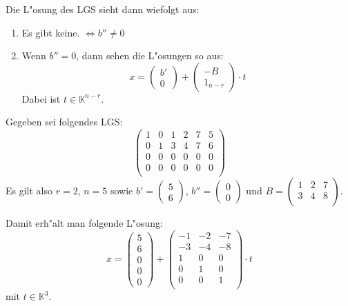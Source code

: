 \documentclass[oneside,fontsize=11pt,paper=a4,BCOR=0mm,DIV=12,automark,headsepline]{scrbook}
\theoremstyle{remark}
\theoremstyle{definition}
\theoremstyle{definition}
\theoremstyle{remark}
\begin{document}
Die L"osung des LGS sieht dann wiefolgt aus:
\begin{relation}
\begin{enumerate}
\item Es gibt keine. $\iff b''\not= 0$
\item Wenn $b''=0$, dann sehen die L"osungen so aus:
  \[x=
    \begin{pmatrix}
      b'\\0
    \end{pmatrix}
    +     \begin{pmatrix}
      -B \\ 1_{n-r}
    \end{pmatrix} \cdot t
  \]  Dabei ist $t\in \mathbb{K}^{n-r}$.
\end{enumerate}
\end{relation}

\begin{exa}
  Gegeben sei folgendes LGS:
  \[\left(
      \begin{array}{ccccc|c}
        1 & 0 & 1 & 2 & 7 & 5\\
        0 & 1 & 3 & 4 & 7 & 6\\
        0 & 0 & 0 & 0 & 0 & 0\\
        0 & 0 & 0 & 0 & 0 & 0\\
      \end{array}
    \right)
  \]
  Es gilt also $r=2$, $n=5$ sowie $b'=
  \begin{pmatrix}
    5\\ 6  
  \end{pmatrix}$, $b''=
  \begin{pmatrix}
    0\\ 0
  \end{pmatrix}$ und $B=
  \begin{pmatrix}
    1 & 2 & 7\\
    3 & 4 & 8\\
  \end{pmatrix}
  $.

  Damit erh"alt man folgende L"osung:
  \[
    x=\begin{pmatrix}
      5\\ 6 \\ 0 \\ 0 \\ 0
    \end{pmatrix} +
    \begin{pmatrix}
      -1 & -2 & -7\\
      -3 & -4 & -8\\
      1 & 0 & 0\\
      0 & 1 & 0\\
      0 & 0 & 1\\
    \end{pmatrix}\cdot t
  \] mit $t\in \mathbb{K}^3$.
\end{exa}
\end{document}
